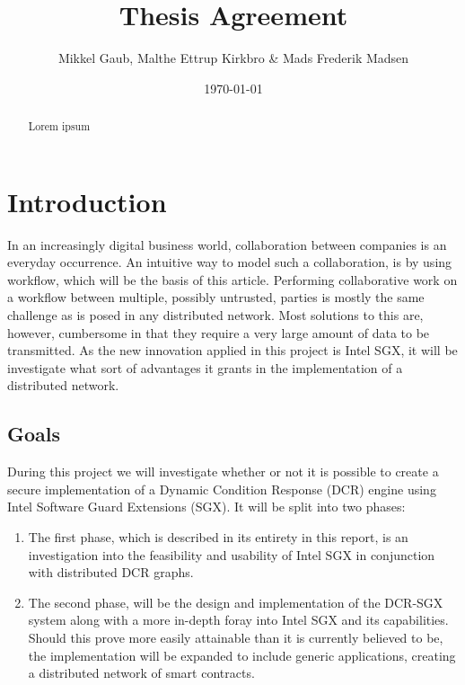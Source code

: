 \documentclass[12pt]{article}
\author{Mikkel Gaub, Malthe Ettrup Kirkbro \& Mads Frederik Madsen}
\title{Thesis Agreement}
\date{\today}
\begin{document}
\maketitle
\thispagestyle{empty}

\vspace{\fill}

\begin{abstract}
Lorem ipsum
\end{abstract}

\pagebreak

\tableofcontents

\pagebreak

	\section{Introduction}

	In an increasingly digital business world, collaboration between companies is an everyday occurrence.
	An intuitive way to model such a collaboration, is by using workflow, which will be the basis of this article.
	Performing collaborative work on a workflow between multiple, possibly untrusted, parties is mostly the same challenge as is posed in any distributed network. 
	Most solutions to this are, however, cumbersome in that they require a very large amount of data to be transmitted.
	As the new innovation applied in this project is Intel SGX, it will be investigate what sort of advantages it grants in the implementation of a distributed network.

		\subsection{Goals}

		During this project we will investigate whether or not it is possible to create a secure implementation of a Dynamic Condition Response\cite{dcr-paper} (DCR) engine using Intel Software Guard Extensions\cite{intel-sgx-explained} (SGX).
		It will be split into two phases:
		\begin{enumerate}
			\item The first phase, which is described in its entirety in this report, is an investigation into the feasibility and usability of Intel SGX in conjunction with distributed DCR graphs.
			\item The second phase, will be the design and implementation of the DCR-SGX system along with a more in-depth foray into Intel SGX and its capabilities. Should this prove more easily attainable than it is currently believed to be, the implementation will be expanded to include generic applications, creating a distributed network of smart contracts\cite{smart-contracts}.
		\end{enumerate}
\end{document}
